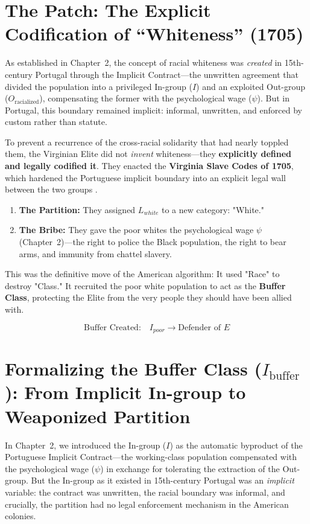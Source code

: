 \documentclass[12pt,openany]{book}
\begin{document}
\section{The Patch: The Explicit Codification of ``Whiteness'' (1705)}
As established in Chapter~2, the concept of racial whiteness was \textit{created} in 15th-century Portugal through the Implicit Contract---the unwritten agreement that divided the population into a privileged In-group ($I$) and an exploited Out-group ($O_{\text{racialized}}$), compensating the former with the psychological wage ($\psi$). But in Portugal, this boundary remained implicit: informal, unwritten, and enforced by custom rather than statute.

To prevent a recurrence of the cross-racial solidarity that had nearly toppled them, the Virginian Elite did not \textit{invent} whiteness---they \textbf{explicitly defined and legally codified it}. They enacted the \textbf{Virginia Slave Codes of 1705}, which hardened the Portuguese implicit boundary into an explicit legal wall between the two groups \cite{allen, kendi}.

\begin{enumerate}
    \item \textbf{The Partition:} They assigned $L_{white}$ to a new category: "White."
    \item \textbf{The Bribe:} They gave the poor whites the psychological wage $\psi$ (Chapter~2)---the right to police the Black population, the right to bear arms, and immunity from chattel slavery.
\end{enumerate}

This was the definitive move of the American algorithm: It used "Race" to destroy "Class." It recruited the poor white population to act as the \textbf{Buffer Class}, protecting the Elite from the very people they should have been allied with.

\[
\text{Buffer Created:} \quad I_{poor} \rightarrow \text{Defender of } E
\]


\section{Formalizing the Buffer Class ($I_{\text{buffer}}$): From Implicit In-group to Weaponized Partition}

In Chapter~2, we introduced the In-group ($I$) as the automatic byproduct of the Portuguese Implicit Contract---the working-class population compensated with the psychological wage ($\psi$) in exchange for tolerating the extraction of the Out-group. But the In-group as it existed in 15th-century Portugal was an \textit{implicit} variable: the contract was unwritten, the racial boundary was informal, and crucially, the partition had no legal enforcement mechanism in the American colonies.
\end{document}

